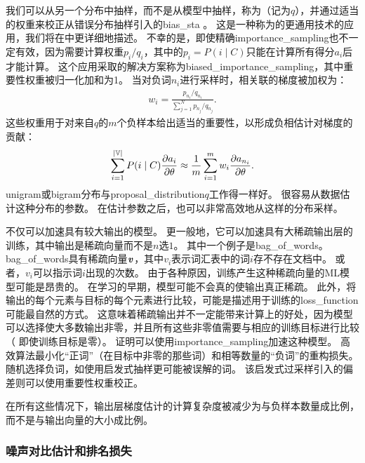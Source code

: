 我们可以从另一个分布中抽样，而不是从模型中抽样，称为（记为$q$），并通过适当的权重来校正从错误分布抽样引入的\gls{bias_sta} \citep{Bengio+Senecal-2003-small,Bengio+Senecal-2008}。
这是一种称为的更通用技术的应用，我们将在中更详细地描述。
不幸的是，即使精确\gls{importance_sampling}也不一定有效，因为需要计算权重$p_i / q_i$，其中的$p_i = P(i \mid C)$只能在计算所有得分$a_i$后才能计算。
这个应用采取的解决方案称为\gls{biased_importance_sampling}，其中重要性权重被归一化加和为1。
当对负词$n_i$进行采样时，相关联的梯度被加权为：
\begin{align}
  w_i = \frac{p_{n_i} / q_{n_i}}{\sum_{j=1}^N p_{n_j} / q_{n_j}}.
\end{align}
这些权重用于对来自$q$的$m$个负样本给出适当的重要性，以形成负相估计对梯度的贡献：
\begin{align}
  \sum_{i=1}^{|\mathbb{V}|} P(i \mid C) \frac{\partial a_i}{\partial \theta}  \approx \frac{1}{m} \sum_{i=1}^m w_i \frac{\partial a_{n_i}}{\partial \theta}.
  \end{align}
  \gls{unigram}或\gls{bigram}分布与\gls{proposal_distribution}$q$工作得一样好。
很容易从数据估计这种分布的参数。
在估计参数之后，也可以非常高效地从这样的分布采样。

不仅可以加速具有较大输出的模型。
更一般地，它可以加速具有大稀疏输出层的训练，其中输出是稀疏向量而不是$n$选$1$。
其中一个例子是\gls{bag_of_words}。
\gls{bag_of_words}具有稀疏向量$\boldsymbol{\mathit{v}}$，其中$v_i$表示词汇表中的词$i$存不存在文档中。
或者，$v_i$可以指示词$i$出现的次数。
由于各种原因，训练产生这种稀疏向量的\gls{ML}模型可能是昂贵的。
在学习的早期，模型可能不会真的使输出真正稀疏。
此外，将输出的每个元素与目标的每个元素进行比较，可能是描述用于训练的\gls{loss_function}可能最自然的方式。
这意味着稀疏输出并不一定能带来计算上的好处，因为模型可以选择使大多数输出非零，并且所有这些非零值需要与相应的训练目标进行比较（ 即使训练目标是零）。
\citet{Dauphin2011-small} 证明可以使用\gls{importance_sampling}加速这种模型。
高效算法最小化``正词''（在目标中非零的那些词）和相等数量的``负词''的重构损失。
随机选择负词，如使用启发式抽样更可能被误解的词。
该启发式过采样引入的偏差则可以使用重要性权重校正。


在所有这些情况下，输出层梯度估计的计算复杂度被减少为与负样本数量成比例，而不是与输出向量的大小成比例。


\subsubsection{噪声对比估计和排名损失}



